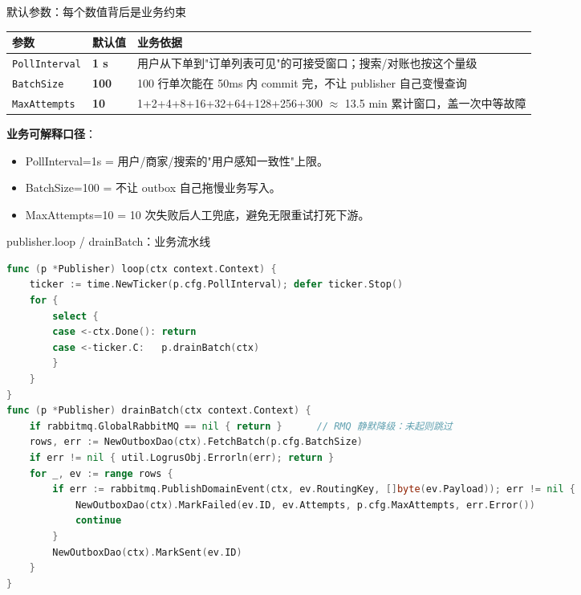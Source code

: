 \documentclass[aspectratio=169,11pt]{beamer}
\begin{document}
\begin{frame}[shrink]{默认参数：每个数值背后是业务约束}
\begin{tabular}{@{}p{2.4cm}p{1.4cm}p{6.8cm}@{}}
\toprule
参数 & 默认值 & 业务依据 \\
\midrule
\texttt{PollInterval} & \textbf{1 s}  & 用户从下单到"订单列表可见"的可接受窗口；搜索/对账也按这个量级 \\
\texttt{BatchSize}    & \textbf{100}  & 100 行单次能在 50ms 内 commit 完，不让 publisher 自己变慢查询 \\
\texttt{MaxAttempts}  & \textbf{10}   & 1+2+4+8+16+32+64+128+256+300 $\approx$ 13.5 min 累计窗口，盖一次中等故障 \\
\bottomrule
\end{tabular}

\vspace{1mm}
{\small \textbf{业务可解释口径}：
\begin{itemize}
  \item PollInterval=1s = 用户/商家/搜索的"用户感知一致性"上限。
  \item BatchSize=100 = 不让 outbox 自己拖慢业务写入。
  \item MaxAttempts=10 = 10 次失败后人工兜底，避免无限重试打死下游。
\end{itemize}}
\end{frame}

\begin{frame}{publisher.loop / drainBatch：业务流水线}
\begin{lstlisting}[language=Go,firstnumber=49,
  caption={}]
func (p *Publisher) loop(ctx context.Context) {
    ticker := time.NewTicker(p.cfg.PollInterval); defer ticker.Stop()
    for {
        select {
        case <-ctx.Done(): return
        case <-ticker.C:   p.drainBatch(ctx)
        }
    }
}
func (p *Publisher) drainBatch(ctx context.Context) {
    if rabbitmq.GlobalRabbitMQ == nil { return }      // RMQ 静默降级：未起则跳过
    rows, err := NewOutboxDao(ctx).FetchBatch(p.cfg.BatchSize)
    if err != nil { util.LogrusObj.Errorln(err); return }
    for _, ev := range rows {
        if err := rabbitmq.PublishDomainEvent(ctx, ev.RoutingKey, []byte(ev.Payload)); err != nil {
            NewOutboxDao(ctx).MarkFailed(ev.ID, ev.Attempts, p.cfg.MaxAttempts, err.Error())
            continue
        }
        NewOutboxDao(ctx).MarkSent(ev.ID)
    }
}
\end{lstlisting}
\end{frame}
\end{document}
